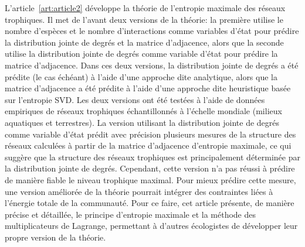 L'article~\ref{art:article2} développe la théorie de l'entropie maximale des
réseaux trophiques. Il met de l'avant deux versions de la théorie: la première
utilise le nombre d'espèces et le nombre d'interactions comme variables d'état
pour prédire la distribution jointe de degrés et la matrice d'adjacence, alors
que la seconde utilise la distribution jointe de degrés comme variable d'état
pour prédire la matrice d'adjacence. Dans ces deux versions, la distribution
jointe de degrés a été prédite (le cas échéant) à l'aide d'une approche dite
analytique, alors que la matrice d'adjacence a été prédite à l'aide d'une
approche dite heuristique basée sur l'entropie SVD. Les deux versions ont été
testées à l'aide de données empiriques de réseaux trophiques échantillonnés à
l'échelle mondiale (milieux aquatiques et terrestres). La version utilisant la
distribution jointe de degrés comme variable d'état prédit avec précision
plusieurs mesures de la structure des réseaux calculées à partir de la matrice
d'adjacence d'entropie maximale, ce qui suggère que la structure des réseaux
trophiques est principalement déterminée par la distribution jointe de degrés.
Cependant, cette version n'a pas réussi à prédire de manière fiable le niveau
trophique maximal. Pour mieux prédire cette mesure, une version améliorée de la
théorie pourrait intégrer des contraintes liées à l'énergie totale de la
communauté. Pour ce faire, cet article présente, de manière précise et
détaillée, le principe d'entropie maximale et la méthode des multiplicateurs de
Lagrange, permettant à d'autres écologistes de développer leur propre version de
la théorie.

\endinput
